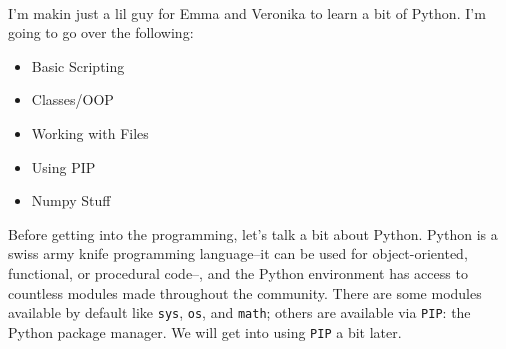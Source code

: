 \documentclass[12pt]{article}
\begin{document}
\noindent

\\

I'm makin just a lil guy for Emma and Veronika to learn a bit of Python. I'm going to go over the following:
\begin{itemize} \item Basic Scripting\end{itemize}
\begin{itemize} \item Classes/OOP\end{itemize}
\begin{itemize} \item Working with Files\end{itemize}
\begin{itemize} \item Using PIP\end{itemize}
\begin{itemize} \item Numpy Stuff\end{itemize}
Before getting into the programming, let's talk a bit about Python. Python is a swiss army knife programming language--it can be used for object-oriented, functional, or procedural code--, and the Python environment has access to countless modules made throughout the community. There are some modules available by default like \texttt{sys}, \texttt{os}, and \texttt{math}; others are available via \texttt{PIP}: the Python package manager. We will get into using \texttt{PIP} a bit later.\\

\\
\end{document}
